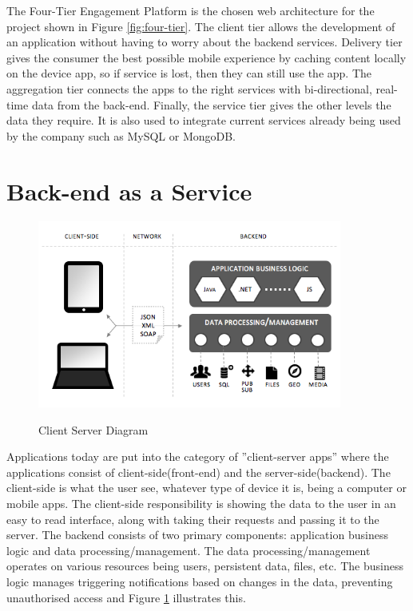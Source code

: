 The Four-Tier Engagement Platform is the chosen web architecture for the project shown in Figure \ref{fig:four-tier}. The client tier allows the development of an application without having to worry about the backend services. Delivery tier gives the consumer the best possible mobile experience by caching content locally on the device app, so if service is lost, then they can still use the app. The aggregation tier connects the apps to the right services with bi-directional, real-time data from the back-end. Finally, the service tier gives the other levels the data they require. It is also used to integrate current services already being used by the company such as MySQL or MongoDB.

\section{Back-end as a Service}

\begin{figure}[!h]
    \caption{Client Server Diagram \cite{backendless} }
    \centering
    \includegraphics[width=100mm]{images/client-server-diagram}
    \label{fig:client-server}
\end{figure}

Applications today are put into the category of ”client-server apps” where the applications consist of client-side(front-end) and the server-side(backend). The client-side is what the user see, whatever type of device it is, being a computer or mobile apps. The client-side responsibility is showing the data to the user in an easy to read interface, along with taking their requests and passing it to the server. The backend consists of two primary components: application business logic and data processing/management. The data processing/management operates on various resources being users, persistent data, files, etc. The business logic manages triggering notifications based on changes in the data, preventing unauthorised access and Figure \ref{fig:client-server} illustrates this.

